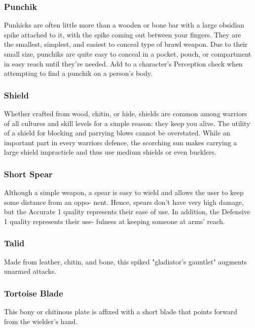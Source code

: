 \begin{multicols}{2}
\subsubsection{Punchik}
\label{itmmlee:punchik}
Punhicks are often little more than a wooden or bone
bar with a large obsidian spike attached to it, with the spike
coming out between your fingers. They are the smallest, simplest,
and easiest to conceal type of brawl weapon. Due to their
small size, punchiks are quite easy to conceal in a pocket,
pouch, or compartment in easy reach until they're needed. Add
\setback to a character's Perception check when attempting to
find a punchik on a person's body.

\subsubsection{Shield}
\label{itmmlee:shield}
Whether crafted from wood, chitin, or hide, shields are
common among warriors of all cultures and skill levels for
a simple reason: they keep you alive. The utility of a shield
for blocking and parrying blows cannot be overstated. While
an important part in every warriors defence, the scorching sun
makes carrying a large shield impracticle and thus use medium
shields or even bucklers.

\subsubsection{Short Spear}
\label{itmmlee:shortspear}
Although a simple weapon, a spear is easy to wield and
allows the user to keep some distance from an oppo-
nent. Hence, spears don’t have very high damage, but
the Accurate 1 quality represents their ease of use. In
addition, the Defensive 1 quality represents their use-
fulness at keeping someone at arms’ reach.

\subsubsection{Talid}
\label{itmmlee:talid}
Made from leather, chitin, and bone, this spiked
"gladiator's gauntlet" augments unarmed attacks.

\subsubsection{Tortoise Blade}
\label{itmmlee:tortoiseblade}
This bony or chitinous plate is affixed with a short
blade that points forward from the wielder's hand.


\end{multicols}
